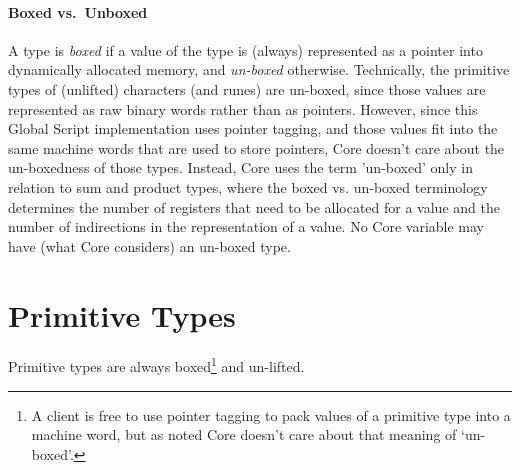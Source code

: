 \documentclass{report}
\newcommand\defn[1]{\emph{#1}}
\begin{document}
\paragraph{Boxed vs.~Unboxed}
A type is \defn{boxed} if a value of the type is (always) represented as a pointer into dynamically allocated memory,
and \defn{un-boxed} otherwise.
Technically, the primitive types of (unlifted) characters (and runes) are un-boxed,
since those values are represented as raw binary words rather than as pointers.
However, since this Global Script implementation uses pointer tagging,
and those values fit into the same machine words that are used to store pointers,
Core doesn't care about the un-boxedness of those types.
Instead, Core uses the term 'un-boxed' only in relation to sum and product types,
where the boxed vs. un-boxed terminology determines the number of registers that need to be allocated for a value and
the number of indirections in the representation of a value.
No Core variable may have (what Core considers) an un-boxed type.

\section{Primitive Types}

Primitive types are always boxed\footnote{
    A client is free to use pointer tagging to pack values of a primitive type into a machine word,
    but as noted Core doesn't care about that meaning of `un-boxed'.
} and un-lifted.
\end{document}
